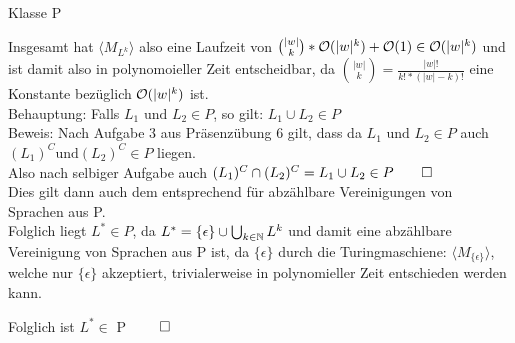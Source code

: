 \documentclass[answers]{submit}
\begin{document}
\begin{exercise}[6]{Klasse P}
{    Insgesamt hat $\langle M_{L^k} \rangle$ also eine Laufzeit von $\binom{|w|}{k}*\mathcal{O}(|w|^k)+\mathcal{O}(1) \in \mathcal{O}(|w|^k)$ und ist damit also in polynomoieller Zeit entscheidbar, da $\binom{|w|}{k} = \frac{|w|!}{k!*(|w|-k)!}$ eine Konstante bezüglich $\mathcal{O}(|w|^k)$ ist.  \\

    Behauptung: Falls $L_1 \text{ und } L_2 \in P$, so gilt: $L_1 \cup L_2 \in P$ \\

    Beweis: Nach Aufgabe 3 aus Präsenzübung 6 gilt, dass da $L_1 \text{ und } L_2 \in P$ auch $(L_1)^C \text{und} (L_2)^C \in P$ liegen. \\

    Also nach selbiger Aufgabe auch $(L_1)^C \cap (L_2)^C = L_1 \cup L_2 \in P \qed$ \\

    Dies gilt dann auch dem entsprechend für abzählbare Vereinigungen von Sprachen aus P. \\

    Folglich liegt $L^* \in P$, da $L^*=\{\epsilon\}\cup\bigcup_{k\in\mathbb{N}} L^k$ und damit eine abzählbare Vereinigung von Sprachen aus P ist, da
    $\{\epsilon\}$ durch die Turingmaschiene: $\langle M_{\{\epsilon\}} \rangle$, welche nur $\{\epsilon\}$ akzeptiert, trivialerweise in polynomieller Zeit entschieden werden kann.

    Folglich ist $L^*\in$ P $\qed$


  }
\end{exercise}
\end{document}
